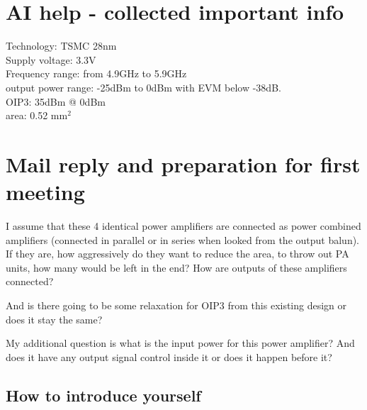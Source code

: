 \documentclass{article}
\begin{document}

\section{AI help - collected important info}

Technology: TSMC 28nm \\
Supply voltage: 3.3V \\
Frequency range: from 4.9GHz to 5.9GHz \\
output power range: -25dBm to 0dBm with EVM below -38dB. \\
OIP3: 35dBm @ 0dBm \\ %
area: 0.52 mm$^2$

\section{Mail reply and preparation for first meeting}

I assume that these 4 identical power amplifiers are connected as power combined amplifiers (connected in parallel or in series when looked from the output balun). If they are, how aggressively do they want to reduce the area, to throw out PA units, how many would be left in the end? How are outputs of these amplifiers connected? %




And is there going to be some relaxation for OIP3 from this existing design or does it stay the same?

My additional question is what is the input power for this power amplifier? And does it have any output signal control inside it or does it happen before it?

\newpage

\subsection{How to introduce yourself}
\end{document}
